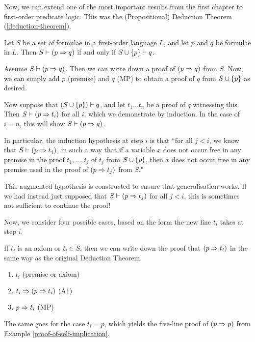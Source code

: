 \documentclass{article}
\begin{document}
Now, we can extend one of the most important results from the first chapter to first-order predicate logic. This was the (Propositional) Deduction Theorem (\ref{deduction-theorem}).

\begin{theorem}
	\label{first-order-deduction-theorem}
    Let $S$ be a set of formulae in a first-order language $L$, and let $p$ and $q$ be formulae in $L$.
    Then $S \vdash (p \Rightarrow q)$ if and only if $S \cup \left\lbrace p \right\rbrace \vdash q$.
\end{theorem}


\begin{prf}
    Assume $S \vdash (p \Rightarrow q)$. Then we can write down a proof of $(p \Rightarrow q)$ from $S$. Now, we can simply add $p$ (premise) and $q$ (MP) to obtain a proof of $q$ from $S \cup \left\lbrace p \right\rbrace$ as desired.
    
    Now suppose that $(S \cup \left\lbrace p \right\rbrace) \vdash q$, and let $t_1 \dots t_n$ be a proof of $q$ witnessing this. Then $S \vdash (p \Rightarrow t_i)$ for all $i$, which we demonstrate by induction. In the case of $i = n$, this will show $S \vdash (p \Rightarrow q)$.
    
    In particular, the induction hypothesis at step $i$ is that
    ``for all $j < i$, we know that $S \vdash (p \Rightarrow t_j)$,
    in such a way that if a variable $x$ does not occur free in any premise in the proof $t_1, \dots, t_j$ of $t_j$ from $S \cup \left\lbrace p \right\rbrace$,
    then $x$ does not occur free in any premise used in the proof of $(p \Rightarrow t_j)$ from $S$."
    
    This augmented hypothesis is constructed to ensure that generalisation works. If we had instead just  supposed that $S \vdash (p \Rightarrow t_j)$ for all $j < i$, this is sometimes not sufficient to continue the proof!
    
    Now, we consider four possible cases, based on the form the new line $t_i$ takes at step $i$.
    
    If $t_i$ is an axiom or $t_i \in S$, then we can write down the proof that $(p \Rightarrow t_i)$ in the same way as the original Deduction Theorem.
    \begin{enumerate}
    	\item $t_i$ \hfill (premise or axiom)
    	\item $t_i \Rightarrow (p \Rightarrow t_i)$ \hfill (A1)
    	\item $p \Rightarrow t_i$ \hfill (MP)
	\end{enumerate}
    The same goes for the case $t_i = p$, which yields the five-line proof of $(p \Rightarrow p)$ from Example \ref{proof-of-self-implication}.
    

\end{prf}
\end{document}

